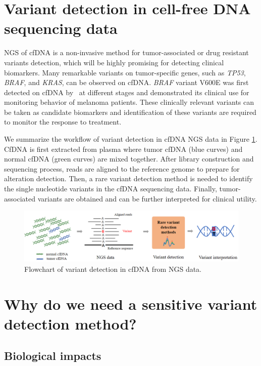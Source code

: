 \documentclass[a4,center,fleqn]{NAR}
\begin{document}
\section{Variant detection in cell-free DNA sequencing data}

NGS of cfDNA is a non-invasive method for tumor-associated or drug resistant variants detection, which will be highly promising for detecting clinical biomarkers. 
Many remarkable variants on tumor-specific genes, such as \textit{TP53}, \textit{BRAF}, and \textit{KRAS}, can be observed on cfDNA.
\textit{BRAF} variant V600E was first detected on cfDNA by~\citep{shinozaki2007utility} at different stages and demonstrated its clinical use for monitoring behavior of melanoma patients.
These clinically relevant variants can be taken as candidate biomarkers and identification of these variants are required to monitor the response to treatment.

\clearpage

We summarize the workflow of variant detection in cfDNA NGS data in Figure \ref{fig:flowchart}.
CfDNA is first extracted from plasma where tumor cfDNA (blue curves) and normal cfDNA (green curves) are mixed together.
After library construction and sequencing process, reads are aligned to the reference genome to prepare for alteration detection.
Then, a rare variant detection method is needed to identify the single nucleotide variants in the cfDNA sequencing data.
Finally, tumor-associated variants are obtained and can be further interpreted for clinical utility.


\begin{figure}[ht]
\centering
\includegraphics[width=1\textwidth]{flowchart.png}
\caption{Flowchart of variant detection in cfDNA from NGS data.}
\label{fig:flowchart}
\end{figure}


\section{Why do we need a sensitive variant detection method?}

\subsection{Biological impacts}
\end{document}
